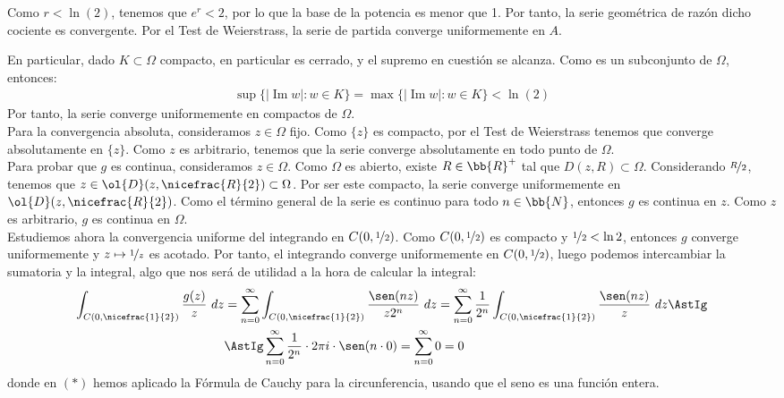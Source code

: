\documentclass[12pt]{article}
\renewcommand{\Im}{\operatorname{Im}}
\begin{document}
\begin{ejercicio}[4 puntos]
\begin{description}
            Como $r<\ln(2)$, tenemos que $e^{r}<2$, por lo que la base de la potencia es menor que 1. Por tanto, la serie geométrica de razón dicho cociente es convergente. Por el Test de Weierstrass, la serie de partida converge uniformemente en $A$.
        \end{description}

        En particular, dado $K\subset \Omega$ compacto, en particular es cerrado, y el supremo en cuestión se alcanza. Como es un subconjunto de $\Omega$, entonces:
        \begin{align*}
            \sup\{|\Im w| : w\in K\}=\max\{|\Im w| : w\in K\} < \ln(2)
        \end{align*}
        Por tanto, la serie converge uniformemente en compactos de $\Omega$.\\

        Para la convergencia absoluta, consideramos $z\in \Omega$ fijo. Como $\{z\}$ es compacto, por el Test de Weierstrass tenemos que converge absolutamente en $\{z\}$. Como $z$ es arbitrario, tenemos que la serie converge absolutamente en todo punto de $\Omega$.\\

        Para probar que $g$ es continua, consideramos $z\in \Omega$. Como $\Omega$ es abierto, existe $R\in \bb{R}^+$ tal que $D(z,R)\subset \Omega$. Considerando $\nicefrac{R}{2}$, tenemos que $z\in \ol{D}(z,\nicefrac{R}{2})\subset \Omega$. Por ser este compacto, la serie converge uniformemente en $\ol{D}(z,\nicefrac{R}{2})$. Como el término general de la serie es continuo para todo $n\in \bb{N}$, entonces $g$ es continua en $z$. Como $z$ es arbitrario, $g$ es continua en $\Omega$.\\

        Estudiemos ahora la convergencia uniforme del integrando en $C(0,\nicefrac{1}{2})$. Como $C(0,\nicefrac{1}{2})$ es compacto y $\nicefrac{1}{2}<\ln 2$, entonces $g$ converge uniformemente y $z\mapsto \nicefrac{1}{z}$ es acotado. Por tanto, el integrando converge uniformemente en $C(0,\nicefrac{1}{2})$, luego podemos intercambiar la sumatoria y la integral, algo que nos será de utilidad a la hora de calcular la integral:
        \begin{align*}
            \int_{C(0,\nicefrac{1}{2})} \frac{g(z)}{z}\ dz &= \sum_{n=0}^{\infty} \int_{C(0,\nicefrac{1}{2})} \frac{\sen(nz)}{z2^n}\ dz
            = \sum_{n=0}^{\infty} \frac{1}{2^n}\int_{C(0,\nicefrac{1}{2})} \frac{\sen(nz)}{z}\ dz \AstIg\\&\AstIg \sum_{n=0}^{\infty} \frac{1}{2^n}\cdot 2\pi i \cdot \sen (n\cdot 0) = \sum_{n=0}^{\infty} 0 = 0
        \end{align*}
        donde en $(\ast)$ hemos aplicado la Fórmula de Cauchy para la circunferencia, usando que el seno es una función entera.
    \end{ejercicio}
\end{document}
